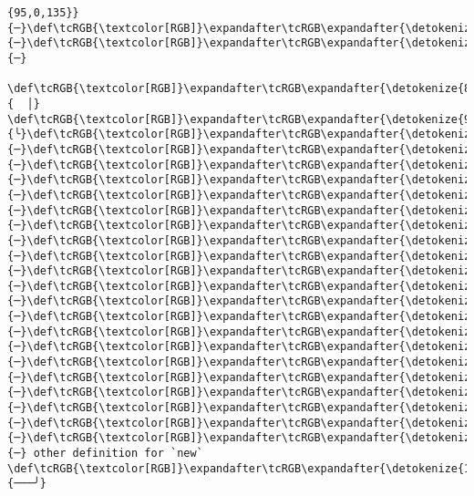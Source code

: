 \documentclass[11pt]{article}
\begin{document}
\begin{Verbatim}[commandchars=\\\{\}, frame=single, framerule=2mm, rulecolor=\color{outerrorbackground}]
{95,0,135}}{─}\def\tcRGB{\textcolor[RGB]}\expandafter\tcRGB\expandafter{\detokenize{95,0,135}}{─}\def\tcRGB{\textcolor[RGB]}\expandafter\tcRGB\expandafter{\detokenize{95,0,135}}{─}  
 \def\tcRGB{\textcolor[RGB]}\expandafter\tcRGB\expandafter{\detokenize{88,88,88}}{  │}                         \def\tcRGB{\textcolor[RGB]}\expandafter\tcRGB\expandafter{\detokenize{95,0,135}}{╰}\def\tcRGB{\textcolor[RGB]}\expandafter\tcRGB\expandafter{\detokenize{95,0,135}}{─}\def\tcRGB{\textcolor[RGB]}\expandafter\tcRGB\expandafter{\detokenize{95,0,135}}{─}\def\tcRGB{\textcolor[RGB]}\expandafter\tcRGB\expandafter{\detokenize{95,0,135}}{─}\def\tcRGB{\textcolor[RGB]}\expandafter\tcRGB\expandafter{\detokenize{95,0,135}}{─}\def\tcRGB{\textcolor[RGB]}\expandafter\tcRGB\expandafter{\detokenize{95,0,135}}{─}\def\tcRGB{\textcolor[RGB]}\expandafter\tcRGB\expandafter{\detokenize{95,0,135}}{─}\def\tcRGB{\textcolor[RGB]}\expandafter\tcRGB\expandafter{\detokenize{95,0,135}}{─}\def\tcRGB{\textcolor[RGB]}\expandafter\tcRGB\expandafter{\detokenize{95,0,135}}{─}\def\tcRGB{\textcolor[RGB]}\expandafter\tcRGB\expandafter{\detokenize{95,0,135}}{─}\def\tcRGB{\textcolor[RGB]}\expandafter\tcRGB\expandafter{\detokenize{95,0,135}}{─}\def\tcRGB{\textcolor[RGB]}\expandafter\tcRGB\expandafter{\detokenize{95,0,135}}{─}\def\tcRGB{\textcolor[RGB]}\expandafter\tcRGB\expandafter{\detokenize{95,0,135}}{─}\def\tcRGB{\textcolor[RGB]}\expandafter\tcRGB\expandafter{\detokenize{95,0,135}}{─}\def\tcRGB{\textcolor[RGB]}\expandafter\tcRGB\expandafter{\detokenize{95,0,135}}{─}\def\tcRGB{\textcolor[RGB]}\expandafter\tcRGB\expandafter{\detokenize{95,0,135}}{─}\def\tcRGB{\textcolor[RGB]}\expandafter\tcRGB\expandafter{\detokenize{95,0,135}}{─}\def\tcRGB{\textcolor[RGB]}\expandafter\tcRGB\expandafter{\detokenize{95,0,135}}{─}\def\tcRGB{\textcolor[RGB]}\expandafter\tcRGB\expandafter{\detokenize{95,0,135}}{─}\def\tcRGB{\textcolor[RGB]}\expandafter\tcRGB\expandafter{\detokenize{95,0,135}}{─}\def\tcRGB{\textcolor[RGB]}\expandafter\tcRGB\expandafter{\detokenize{95,0,135}}{─}\def\tcRGB{\textcolor[RGB]}\expandafter\tcRGB\expandafter{\detokenize{95,0,135}}{─} other definition for `new`
\def\tcRGB{\textcolor[RGB]}\expandafter\tcRGB\expandafter{\detokenize{148,148,148}}{───╯}
    \end{Verbatim}
\end{document}
